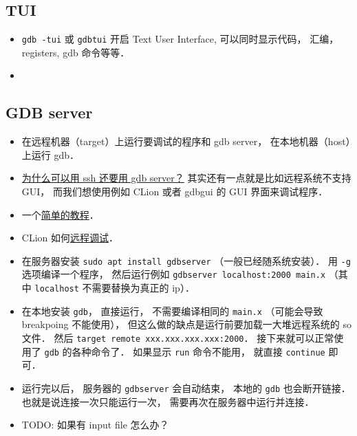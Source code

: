 \subsection{TUI}
\begin{itemize}
\item \verb`gdb -tui` 或 \verb`gdbtui` 开启 Text User Interface, 可以同时显示代码， 汇编， registers, gdb 命令等等．
\item 
\end{itemize}


\subsection{GDB server}
\begin{itemize}
\item 在远程机器（target）上运行要调试的程序和 gdb server， 在本地机器（host）上运行 gdb．
\item \href{https://stackoverflow.com/questions/69176457/the-difference-between-gdbserver-and-remote-gdb}{为什么可以用 ssh 还要用 gdb server？} 其实还有一点就是比如远程系统不支持 GUI， 而我们想使用例如 CLion 或者 gdbgui 的 GUI 界面来调试程序．
\item 一个\href{https://www.thegeekstuff.com/2014/04/gdbserver-example/}{简单的教程}．
\item CLion 如何\href{https://www.jetbrains.com/help/clion/remote-debug.html}{远程调试}．
\item 在服务器安装 \verb|sudo apt install gdbserver| （一般已经随系统安装）． 用 \verb|-g| 选项编译一个程序， 然后运行例如 \verb|gdbserver localhost:2000 main.x| （其中 \verb|localhost| 不需要替换为真正的 ip）．
\item 在本地安装 \verb|gdb|， 直接运行， 不需要编译相同的 \verb|main.x| （可能会导致 breakpoing 不能使用）， 但这么做的缺点是运行前要加载一大堆远程系统的 so 文件． 然后 \verb|target remote xxx.xxx.xxx.xxx:2000|． 接下来就可以正常使用了 \verb|gdb| 的各种命令了． 如果显示 \verb|run| 命令不能用， 就直接 \verb|continue| 即可．
\item 运行完以后， 服务器的 \verb|gdbserver| 会自动结束， 本地的 \verb|gdb| 也会断开链接． 也就是说连接一次只能运行一次， 需要再次在服务器中运行并连接．
\item TODO: 如果有 input file 怎么办？
\end{itemize}
